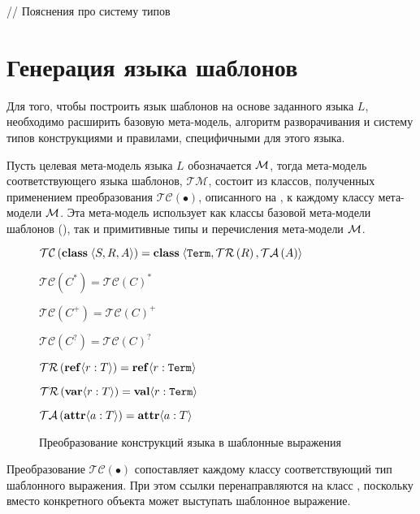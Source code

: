 // Пояснения про систему типов

\section{Генерация языка шаблонов}

\newcommand{\TM}{\mathcal{TM}}
\newcommand{\TC}[1]{\mathcal{TC}\left(#1\right)}
\newcommand{\TR}[1]{\mathcal{TR}\left(#1\right)}
\newcommand{\TA}[1]{\mathcal{TA}\left(#1\right)}

Для того, чтобы построить язык шаблонов на основе заданного языка $L$, необходимо расширить базовую мета-модель, алгоритм разворачивания и систему типов конструкциями и правилами, специфичными для этого языка. 

Пусть целевая мета-модель языка $L$ обозначается $\mathcal{M}$, тогда мета-модель соответствующего языка шаблонов, $\TM$, состоит из классов, полученных применением преобразования $\TC{\bullet}$, описанного на , к каждому классу мета-модели $\mathcal{M}$. Эта мета-модель использует как классы базовой мета-модели шаблонов (), так и примитивные типы и перечисления мета-модели $\mathcal{M}$.

\begin{figure}[htbp]
	\centering
$\TC{\class{}{S}{R}{A}} = \class{}
			{\mathtt{Term}}{\TR{R}}{\TA{A}}$
			
$\TC{C^*} = \TC{C}^*$

$\TC{C^+} = \TC{C}^+$

$\TC{C^?} = \TC{C}^?$

$\TR{\reference{ref}{r}{T}} = \reference{ref}{r}{\mathtt{Term}}$

$\TR{\reference{var}{r}{T}} = \reference{val}{r}{\mathtt{Term}}$

$\TA{\attribute{a}{T}} = \attribute{a}{T}$
	\caption{Преобразование конструкций языка в шаблонные выражения}\label{TC}
\end{figure}

Преобразование $\TC{\bullet}$ сопоставляет каждому классу соответствующий тип шаблонного выражения. При этом ссылки перенаправляются на класс , поскольку вместо конкретного объекта может выступать шаблонное выражение.

